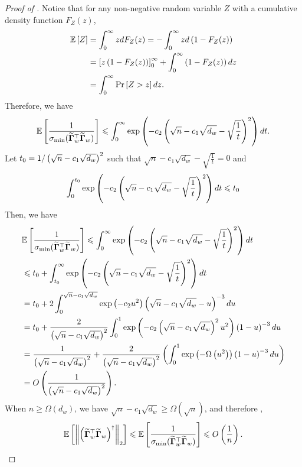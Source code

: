 \begin{proof}[Proof of ]
    Notice that for any non-negative random variable $Z$ with a cumulative density function $F_Z(z)$, 
    \begin{align*}
        \mathbb{E}\left[Z\right] &= \int_0^\infty z d F_Z(z) 
        = - \int_0^\infty z d \left(1 - F_Z(z)\right) \\
        &= \left[z \left(1 - F_Z(z)\right)\right]_0^\infty + \int_0^\infty \left(1 - F_Z(z)\right) dz \\
        &= \int_0^\infty \Pr\left[Z > z\right] dz.
    \end{align*}
    Therefore, we have
    \begin{align*}
        \mathbb{E}\left[\frac{1}{\sigma_{\min}(\widetilde{\boldsymbol{\Gamma}}_w^\top \widetilde{\boldsymbol{\Gamma}}_w)}\right] \leqslant \int_0^\infty \exp\left(-c_2 \left(\sqrt{n} - c_1 \sqrt{d_w} - \sqrt{\frac{1}{t}}\right)^2\right) d t.
    \end{align*}
    Let $t_0 = 1 / \left(\sqrt{n} - c_1 \sqrt{d_w}\right)^2$ such that $\sqrt{n} - c_1 \sqrt{d_w} - \sqrt{\frac{1}{t}}=0$ and 
    \begin{align*}
        \int_{0}^{t_0} \exp\left(-c_2 \left(\sqrt{n} - c_1 \sqrt{d_w} - \sqrt{\frac{1}{t}}\right)^2\right) d t \leqslant t_0
    \end{align*}
    Then, we have
    \begin{align*}
        &\mathbb{E}\left[\frac{1}{\sigma_{\min}(\widetilde{\boldsymbol{\Gamma}}_w^\top \widetilde{\boldsymbol{\Gamma}}_w)}\right] 
        \leqslant \int_0^\infty \exp\left(-c_2 \left(\sqrt{n} - c_1 \sqrt{d_w} - \sqrt{\frac{1}{t}}\right)^2\right) d t \\
        &\leqslant t_0 + \int_{t_0}^\infty \exp\left(-c_2 \left(\sqrt{n} - c_1 \sqrt{d_w} - \sqrt{\frac{1}{t}}\right)^2\right) d t \\
        &= t_0 + 2 \int_{0}^{\sqrt{n}-c_1\sqrt{d_w}} \exp\left(-c_2 u^2\right) \left(\sqrt{n} - c_1 \sqrt{d_w} - u\right)^{-3} d u \\
        &= t_0 + \frac{2}{\left(\sqrt{n} - c_1 \sqrt{d_w}\right)^2} \int_{0}^{1} \exp\left(-c_2 \left(\sqrt{n}-c_1\sqrt{d_w}\right)^2 u^2\right) \left(1 - u\right)^{-3} d u \\
        &= \frac{1}{\left(\sqrt{n} - c_1 \sqrt{d_w}\right)^2} + \frac{2}{\left(\sqrt{n} - c_1 \sqrt{d_w}\right)^2} \left(\int_{0}^{1} \exp\left(-\Omega\left(u^2\right)\right) \left(1 - u\right)^{-3} d u\right) \\
        &= O\left(\frac{1}{\left(\sqrt{n} - c_1 \sqrt{d_w}\right)^2}\right).
    \end{align*}
    When $n \ge \Omega(d_w)$, we have $\sqrt{n} - c_1 \sqrt{d_w} \ge \Omega(\sqrt{n})$, and therefore ,
    \begin{align*}
        \mathbb{E}\left[\left\|\left(\widetilde{\boldsymbol{\Gamma}}_w^\top \widetilde{\boldsymbol{\Gamma}}_w\right)^\dagger\right\|_2\right]
        \leqslant \mathbb{E}\left[\frac{1}{\sigma_{\min}(\widetilde{\boldsymbol{\Gamma}}_w^\top \widetilde{\boldsymbol{\Gamma}}_w)}\right] 
        \leqslant O\left(\frac{1}{n}\right).
    \end{align*}
\end{proof}





